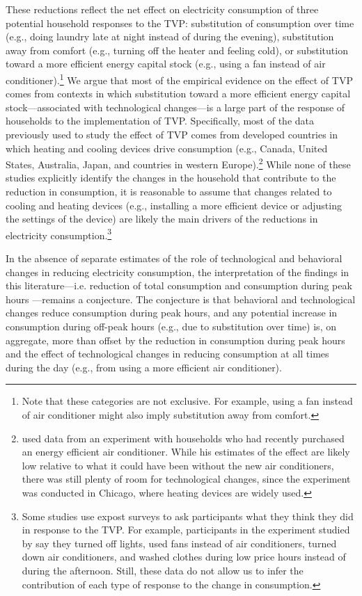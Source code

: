 \documentclass[12pt]{article}
\begin{document}
These reductions reflect the net effect on electricity consumption of three potential household responses to the TVP: substitution of consumption over time (e.g., doing laundry late at night instead of during the evening), substitution away from comfort (e.g., turning off the heater and feeling cold), or substitution toward a more efficient energy capital stock (e.g., using a fan instead of air conditioner).\footnote{ Note that these categories are not exclusive. For example, using a fan instead of air conditioner might also imply substitution away from comfort.} We argue that most of the empirical evidence on the effect of TVP comes from contexts in which substitution toward a more efficient energy capital stock---associated with technological changes---is a large part of the response of households to the implementation of TVP. Specifically, most of the data previously used to study the effect of TVP comes from developed countries in which heating and cooling devices drive consumption (e.g., Canada, United States, Australia, Japan, and countries in western Europe).\footnote{\citet{allcottRethinkingRealtimeElectricity2011} used data from an experiment with households who had recently purchased an energy efficient air conditioner. While his estimates of the effect are likely low relative to what it could have been without the new air conditioners, there was still plenty of room for technological changes, since the experiment was conducted in Chicago, where heating devices are widely used.}  While none of these studies explicitly identify the changes in the household that contribute to the reduction in consumption, it is reasonable to assume that changes related to cooling and heating devices (e.g., installing a more efficient device or adjusting the settings of the device) are likely the main drivers of the reductions in electricity consumption.\footnote{Some studies use expost surveys to ask participants what they think they did in response to the TVP. For example, participants in the experiment studied by \citet{allcottRethinkingRealtimeElectricity2011} say they turned off lights, used fans instead of air conditioners, turned down air conditioners, and washed clothes during low price hours instead of during the afternoon. Still, these data do not allow us to infer the contribution of each type of response to the change in consumption.}

\sloppy In the absence of separate estimates of the role of technological and behavioral changes in reducing electricity consumption, the interpretation of the findings in this literature---i.e.  reduction of total consumption and consumption during peak hours \citep{allcottRethinkingRealtimeElectricity2011,jessoeUnderstandingRolePrice2014}---remains a conjecture. The conjecture is that behavioral and technological changes reduce consumption during peak hours, and any potential increase in consumption during off-peak hours (e.g., due to substitution over time) is, on aggregate, more than offset by the reduction in consumption during peak hours and the effect of technological changes in reducing consumption at all times during the day (e.g., from using a more efficient air conditioner).
\end{document}
